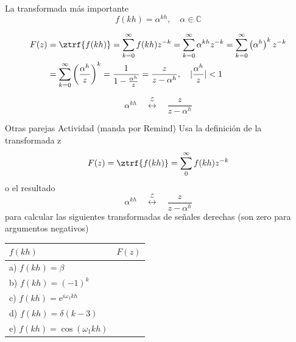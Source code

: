 \documentclass[presentation,aspectratio=169]{beamer}
\begin{document}
\begin{frame}[label={sec:orgd76119b}]{La transformada más importante}
\[f(kh) = \alpha^{kh}, \quad \alpha \in \mathbb{C}\]

\begin{align*}
   F(z) &= \ztrf{f(kh)} = \sum_{k=0}^{\infty} f(kh)z^{-k}
   =  \sum_{k=0}^{\infty} \alpha^{kh}z^{-k} =  \sum_{k=0}^{\infty} \left(\alpha^{h}\right)^kz^{-k}\\
   &=  \sum_{k=0}^{\infty} \left(\frac{\alpha^{h}}{z}\right)^{k}
   =  \frac{1}{1 - \frac{\alpha^h}{z}} = \frac{z}{z-\alpha^{h}}, \quad |\frac{\alpha^h}{z}| < 1
\end{align*}

\begin{tcolorbox}
\[ \alpha^{kh} \quad  \overset{\mathcal{Z}}{\longleftrightarrow} \quad \frac{z}{z-\alpha^h} \]
\end{tcolorbox}
\end{frame}


\begin{frame}[label={sec:org5100db5}]{Otras parejas}
\alert{Actividad (manda por Remind)} Usa la definición de la transformada z
\[ F(z) = \ztrf{f(kh)} = \sum_0^\infty f(kh)z^{-k} \] o el resultado
\[ \alpha^{kh} \quad  \overset{\mathcal{Z}}{\longleftrightarrow} \quad \frac{z}{z-\alpha^h} \]
para calcular las siguientes transformadas de señales derechas (son zero para argumentos negativos)

\begin{center}
\begin{tabular}{ll}
\(f(kh)\) & \(F(z)\)\\
\hline
a) \(f(kh)=\beta\) & \\
b) \(f(kh)=(-1)^k\) & \\
c) \(f(kh) = \mathrm{e}^{i\omega_1 kh}\) & \\
d) \(f(kh) =  \delta(k-3)\) & \\
e) \(f(kh) = \cos(\omega_1 kh)\) & \\
\end{tabular}
\end{center}
\end{frame}
\end{document}
